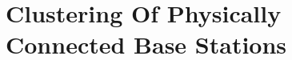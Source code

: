 \documentclass[10pt, letter,twocolumn]{IEEEtran}
\begin{document}
%
\vspace{-0.0cm}
\section{Clustering Of Physically Connected Base Stations} \label{sec_clustering}
\end{document}
